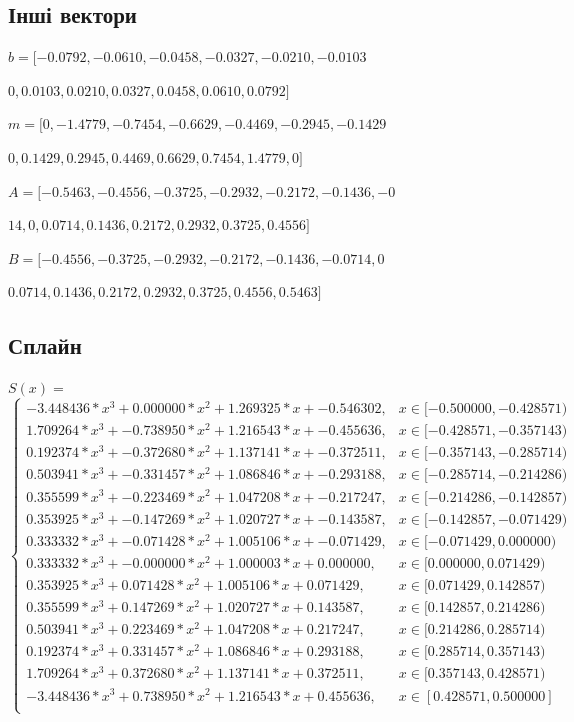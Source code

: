 \documentclass[a4paper, 12pt]{article}
\begin{document}
\newpage
\subsection{Інші вектори}

\( b = [ -0.0792 , -0.0610 , -0.0458 , -0.0327 , -0.0210 , -0.0103  \) 

\( 0 , 0.0103 , 0.0210 , 0.0327 , 0.0458 , 0.0610 , 0.0792 ] \)

\( m = [ 0 , -1.4779 , -0.7454 , -0.6629 , -0.4469 , -0.2945 , -0.1429 \) 

\( 0 , 0.1429 , 0.2945 , 0.4469 , 0.6629 , 0.7454 , 1.4779 , 0 ] \)

\( A = [ -0.5463 , -0.4556 , -0.3725 , -0.2932 , -0.2172 , -0.1436 , -0\) 

\( 14 , 0 , 0.0714 , 0.1436 , 0.2172 , 0.2932 , 0.3725 , 0.4556 ] \)

\( B = [ -0.4556 , -0.3725 , -0.2932 , -0.2172 , -0.1436 , -0.0714 , 0 \) 

\( 0.0714 , 0.1436 , 0.2172 , 0.2932 , 0.3725 , 0.4556 , 0.5463 ] \)

\subsection{Сплайн}
\(S(x) = \)
\[
\begin{cases}
-3.448436 * x^3 + 0.000000 * x^2 + 1.269325 * x + -0.546302, & x \in [-0.500000, -0.428571) \\
1.709264 * x^3 + -0.738950 * x^2 + 1.216543 * x + -0.455636, & x \in [-0.428571, -0.357143) \\
0.192374 * x^3 + -0.372680 * x^2 + 1.137141 * x + -0.372511, & x \in [-0.357143, -0.285714) \\
0.503941 * x^3 + -0.331457 * x^2 + 1.086846 * x + -0.293188, & x \in [-0.285714, -0.214286) \\
0.355599 * x^3 + -0.223469 * x^2 + 1.047208 * x + -0.217247, & x \in [-0.214286, -0.142857) \\
0.353925 * x^3 + -0.147269 * x^2 + 1.020727 * x + -0.143587, & x \in [-0.142857, -0.071429) \\
0.333332 * x^3 + -0.071428 * x^2 + 1.005106 * x + -0.071429, & x \in [-0.071429, 0.000000) \\
0.333332 * x^3 + -0.000000 * x^2 + 1.000003 * x + 0.000000, & x \in [0.000000, 0.071429) \\
0.353925 * x^3 + 0.071428 * x^2 + 1.005106 * x + 0.071429, & x \in [0.071429, 0.142857) \\
0.355599 * x^3 + 0.147269 * x^2 + 1.020727 * x + 0.143587, & x \in [0.142857, 0.214286) \\
0.503941 * x^3 + 0.223469 * x^2 + 1.047208 * x + 0.217247, & x \in [0.214286, 0.285714) \\
0.192374 * x^3 + 0.331457 * x^2 + 1.086846 * x + 0.293188, & x \in [0.285714, 0.357143) \\
1.709264 * x^3 + 0.372680 * x^2 + 1.137141 * x + 0.372511, & x \in [0.357143, 0.428571) \\
-3.448436 * x^3 + 0.738950 * x^2 + 1.216543 * x + 0.455636, & x \in [0.428571, 0.500000] \\
\end{cases}
\]
\end{document}

